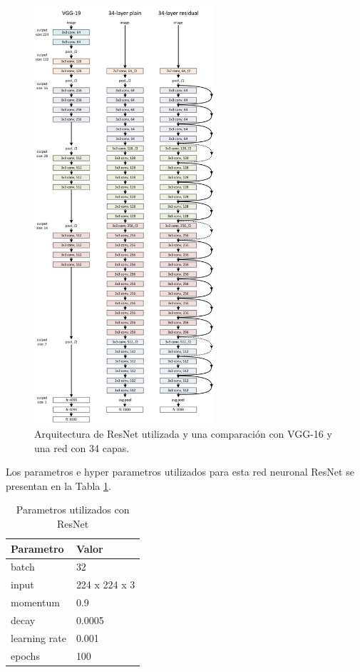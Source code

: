 \documentclass{article}
\begin{document}
\begin{figure}[H]
	\centering
	\includegraphics[width=0.6\textwidth]{img/resnet2}		
	\caption{Arquitectura de ResNet utilizada y una comparación con VGG-16 y una red con 34 capas.}
	\label{fig:resnet2}
\end{figure} 

	Los parametros e hyper parametros utilizados para esta red neuronal ResNet se presentan en la Tabla \ref{tab:resnet}.
	
	\begin{table}[h]
		\centering		
		\caption{Parametros utilizados con ResNet}
		\label{tab:resnet}
		\begin{tabular}{ p{3cm} p{3cm}}
			\hline 
			\textbf{Parametro} & \textbf{Valor}   \\
			\hline 
			batch & 32 \\
			input & 224 x 224 x 3 \\
			momentum & 0.9 \\
			decay & 0.0005 \\
			learning rate & 0.001 \\
			epochs & 100 \\
			\hline 
		\end{tabular}
	\end{table}
\end{document}
